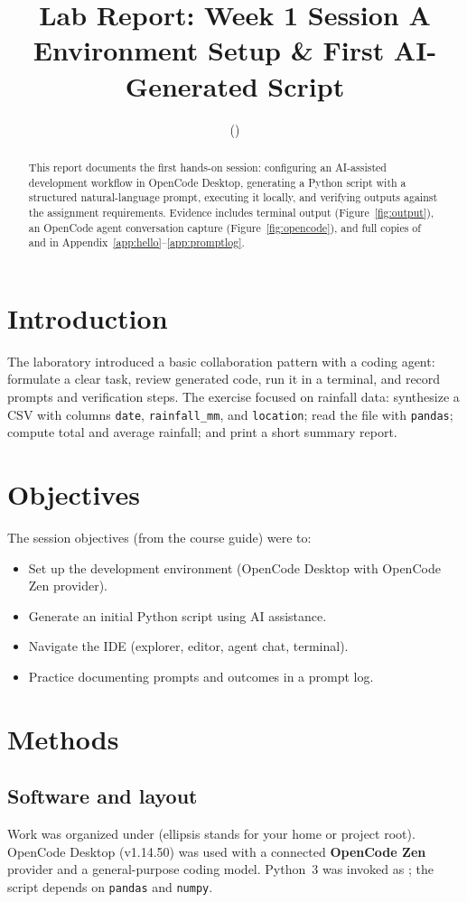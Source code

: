 \documentclass[11pt,a4paper]{article}
\title{Lab Report: Week 1 Session A\\Environment Setup \& First AI-Generated Script}
\author{\studentname \quad (\studentid)}
\date{\reportdate}
\begin{document}
\maketitle

\begin{abstract}
This report documents the first hands-on session: configuring an AI-assisted development workflow in OpenCode Desktop, generating a Python script with a structured natural-language prompt, executing it locally, and verifying outputs against the assignment requirements. Evidence includes terminal output (Figure~\ref{fig:output}), an OpenCode agent conversation capture (Figure~\ref{fig:opencode}), and full copies of  and  in Appendix~\ref{app:hello}--\ref{app:promptlog}.
\end{abstract}

\section{Introduction}
The laboratory introduced a basic collaboration pattern with a coding agent: formulate a clear task, review generated code, run it in a terminal, and record prompts and verification steps. The exercise focused on rainfall data: synthesize a CSV with columns \texttt{date}, \texttt{rainfall\_mm}, and \texttt{location}; read the file with \texttt{pandas}; compute total and average rainfall; and print a short summary report.

\section{Objectives}
The session objectives (from the course guide) were to:
\begin{itemize}[noitemsep]
  \item Set up the development environment (OpenCode Desktop with OpenCode Zen provider).
  \item Generate an initial Python script using AI assistance.
  \item Navigate the IDE (explorer, editor, agent chat, terminal).
  \item Practice documenting prompts and outcomes in a prompt log.
\end{itemize}

\section{Methods}

\subsection{Software and layout}
Work was organized under  (ellipsis stands for your home or project root). OpenCode Desktop (v1.14.50) was used with a connected \textbf{OpenCode Zen} provider and a general-purpose coding model. Python~3 was invoked as ; the script depends on \texttt{pandas} and \texttt{numpy}.
\end{document}
